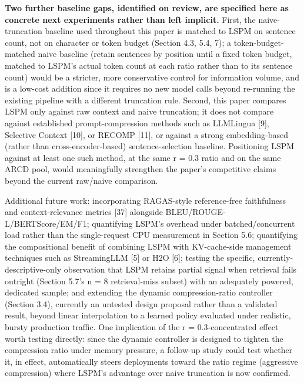\textbf{Two further baseline gaps, identified on review, are specified here as concrete next experiments rather than left implicit.} First, the naive-truncation baseline used throughout this paper is matched to LSPM on sentence count, not on character or token budget (Section 4.3, 5.4, 7); a token-budget-matched naive baseline (retain sentences by position until a fixed token budget, matched to LSPM's actual token count at each ratio rather than to its sentence count) would be a stricter, more conservative control for information volume, and is a low-cost addition since it requires no new model calls beyond re-running the existing pipeline with a different truncation rule. Second, this paper compares LSPM only against raw context and naive truncation; it does not compare against established prompt-compression methods such as LLMLingua [9], Selective Context [10], or RECOMP [11], or against a strong embedding-based (rather than cross-encoder-based) sentence-selection baseline. Positioning LSPM against at least one such method, at the same r = 0.3 ratio and on the same ARCD pool, would meaningfully strengthen the paper's competitive claims beyond the current raw/naive comparison.

Additional future work: incorporating RAGAS-style reference-free faithfulness and context-relevance metrics [37] alongside BLEU/ROUGE-L/BERTScore/EM/F1; quantifying LSPM's overhead under batched/concurrent load rather than the single-request CPU measurement in Section 5.6; quantifying the compositional benefit of combining LSPM with KV-cache-side management techniques such as StreamingLLM [5] or H2O [6]; testing the specific, currently-descriptive-only observation that LSPM retains partial signal when retrieval fails outright (Section 5.7's n = 8 retrieval-miss subset) with an adequately powered, dedicated sample; and extending the dynamic compression-ratio controller (Section 3.4), currently an untested design proposal rather than a validated result, beyond linear interpolation to a learned policy evaluated under realistic, bursty production traffic. One implication of the r = 0.3-concentrated effect worth testing directly: since the dynamic controller is designed to tighten the compression ratio under memory pressure, a follow-up study could test whether it, in effect, automatically steers deployments toward the ratio regime (aggressive compression) where LSPM's advantage over naive truncation is now confirmed.

